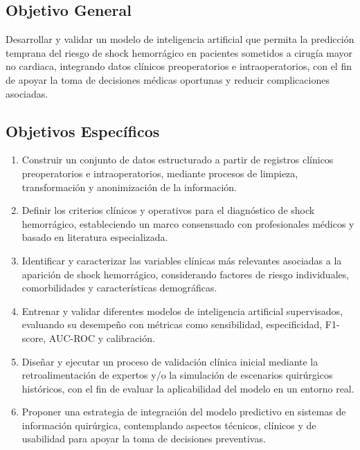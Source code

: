 \documentclass[12pt, letterpaper]{article}
\begin{document}
\subsection{Objetivo General}

Desarrollar y validar un modelo de inteligencia artificial que permita la predicción temprana del riesgo de shock hemorrágico en pacientes sometidos a cirugía mayor no cardiaca, integrando datos clínicos preoperatorios e intraoperatorios, con el fin de apoyar la toma de decisiones médicas oportunas y reducir complicaciones asociadas.

\subsection{Objetivos Específicos}

\begin{enumerate}[label=\alph*)]
    \item Construir un conjunto de datos estructurado a partir de registros clínicos preoperatorios e intraoperatorios, mediante procesos de limpieza, transformación y anonimización de la información.
    \item Definir los criterios clínicos y operativos para el diagnóstico de shock hemorrágico, estableciendo un marco consensuado con profesionales médicos y basado en literatura especializada.
    \item Identificar y caracterizar las variables clínicas más relevantes asociadas a la aparición de shock hemorrágico, considerando factores de riesgo individuales, comorbilidades y características demográficas.
    \item Entrenar y validar diferentes modelos de inteligencia artificial supervisados, evaluando su desempeño con métricas como sensibilidad, especificidad, F1-score, AUC-ROC y calibración.
    \item Diseñar y ejecutar un proceso de validación clínica inicial mediante la retroalimentación de expertos y/o la simulación de escenarios quirúrgicos históricos, con el fin de evaluar la aplicabilidad del modelo en un entorno real.
    \item Proponer una estrategia de integración del modelo predictivo en sistemas de información quirúrgica, contemplando aspectos técnicos, clínicos y de usabilidad para apoyar la toma de decisiones preventivas.
\end{enumerate}

\newpage

\end{document}
